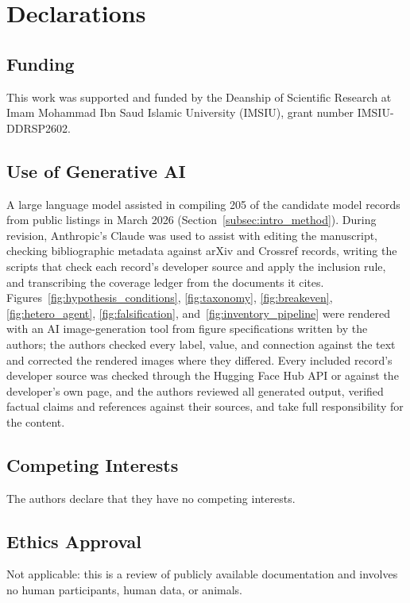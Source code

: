 \section*{Declarations}
\label{section:declarations}

\subsection*{Funding}
This work was supported and funded by the Deanship of Scientific Research at Imam Mohammad Ibn Saud Islamic University (IMSIU), grant number IMSIU-DDRSP2602.

\subsection*{Use of Generative AI}
A large language model assisted in compiling 205 of the candidate model records from public listings in March 2026 (Section~\ref{subsec:intro_method}). During revision, Anthropic's Claude was used to assist with editing the manuscript, checking bibliographic metadata against arXiv and Crossref records, writing the scripts that check each record's developer source and apply the inclusion rule, and transcribing the coverage ledger from the documents it cites. Figures~\ref{fig:hypothesis_conditions}, \ref{fig:taxonomy}, \ref{fig:breakeven}, \ref{fig:hetero_agent}, \ref{fig:falsification}, and~\ref{fig:inventory_pipeline} were rendered with an AI image-generation tool from figure specifications written by the authors; the authors checked every label, value, and connection against the text and corrected the rendered images where they differed. Every included record's developer source was checked through the Hugging Face Hub API or against the developer's own page, and the authors reviewed all generated output, verified factual claims and references against their sources, and take full responsibility for the content.

\subsection*{Competing Interests}
The authors declare that they have no competing interests.

\subsection*{Ethics Approval}
Not applicable: this is a review of publicly available documentation and involves no human participants, human data, or animals.

